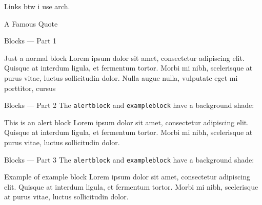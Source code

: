 \documentclass[17pt,aspectratio=169]{beamer}
\begin{document}
\begin{frame}{Links}
  btw i use arch\footnotemark.
\end{frame}

\begin{frame}{A Famous Quote}
\end{frame}

\begin{frame}{Blocks --- Part 1}
  \begin{block}{Just a normal block}
    Lorem ipsum dolor sit amet, consectetur adipiscing elit. Quisque at interdum
    ligula, et fermentum tortor. Morbi mi nibh, scelerisque at purus vitae,
    luctus sollicitudin dolor. Nulla augue nulla, vulputate eget mi porttitor,
    cursus
  \end{block}
\end{frame}

\begin{frame}{Blocks --- Part 2}
  The \texttt{alertblock} and \texttt{exampleblock} have a background shade:
  \begin{alertblock}{This is an alert block}
    Lorem ipsum dolor sit amet, consectetur adipiscing elit. Quisque at interdum
    ligula, et fermentum tortor. Morbi mi nibh, scelerisque at purus vitae,
    luctus sollicitudin dolor.
  \end{alertblock}
\end{frame}

\begin{frame}{Blocks --- Part 3}
  The \texttt{alertblock} and \texttt{exampleblock} have a background shade:
  \begin{exampleblock}{Example of example block}
    Lorem ipsum dolor sit amet, consectetur adipiscing elit. Quisque at interdum
    ligula, et fermentum tortor. Morbi mi nibh, scelerisque at purus vitae,
    luctus sollicitudin dolor.
  \end{exampleblock}
\end{frame}

\end{document}
